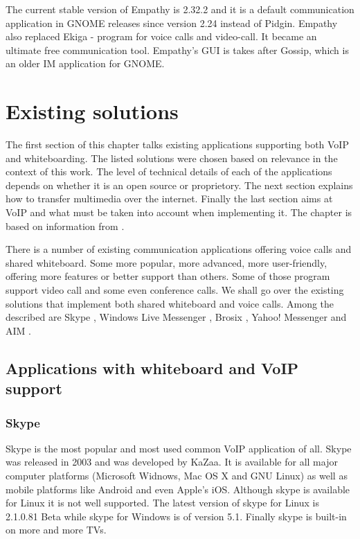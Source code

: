 The current stable version of Empathy is 2.32.2 and it is a default communication application in GNOME releases since version 2.24 instead of Pidgin. Empathy also replaced Ekiga - program for voice calls and video-call. It became an ultimate free communication tool. Empathy's GUI is takes after Gossip, which is an older IM application for GNOME. 


\chapter{Existing solutions}\label{chapter:existing-solutions}
The first section of this chapter talks existing applications supporting both VoIP and whiteboarding. The listed solutions were chosen based on relevance in the context of this work. The level of technical details of each of the applications depends on whether it is an open source or proprietory. The next section explains how to transfer multimedia over the internet. Finally the last section aims at VoIP and what must be taken into account when implementing it. The chapter is based on information from \cite{skypeProtocolAnalysis,voipPaper,digitalSpeechBook}.

There is a number of existing communication applications offering voice calls and shared whiteboard. Some more popular, more advanced, more user-friendly, offering more features or better support than others. Some of those program support video call and some even conference calls. We shall go over the existing solutions that implement both shared whiteboard and voice calls. Among the described are Skype \cite{skype}, Windows Live Messenger \cite{WindowsLiveMessenger}, Brosix \cite{brosix}, Yahoo! Messenger \cite{yahoo} and AIM \cite{AIM}.

\section{Applications with whiteboard and VoIP support}
\subsection*{Skype}
Skype is the most popular and most used common VoIP application of all. Skype was released in 2003 and was developed by KaZaa\cite{kazaa}. It is available for all major computer platforms (Microsoft Widnows, Mac OS X and GNU Linux) as well as mobile platforms like Android and even Apple's iOS. Although skype is available for Linux it is not well supported. The latest version of skype for Linux is 2.1.0.81 Beta while skype for Windows is of version 5.1. Finally skype is built-in on more and more TVs.

